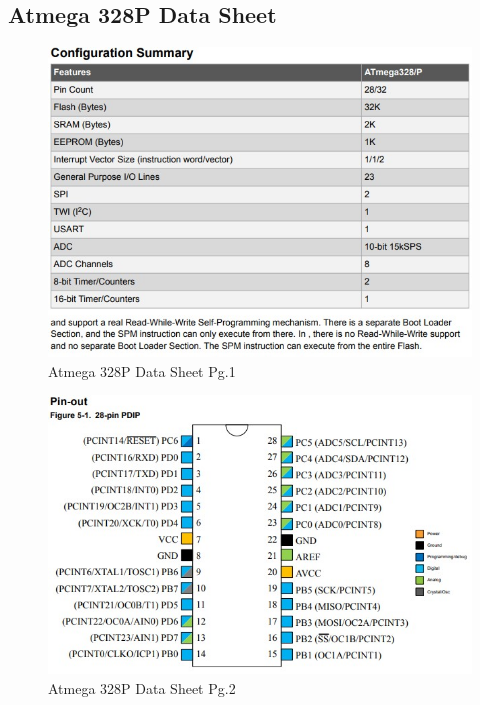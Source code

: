 \documentclass[12pt]{article}
\begin{document}
{{{{		\subsection{Atmega 328P Data Sheet}
			\begin{figure}[ht!]
				\centering
				\includegraphics[width=125mm]{assets/Atmega_DataSheet.jpg}
				\caption{Atmega 328P Data Sheet Pg.1\label{overflow}}
			\end{figure}
		
			\begin{figure}[ht!]
				\centering
				\includegraphics[width=125mm]{assets/Atmega_DataSheet2.jpg}
				\caption{Atmega 328P Data Sheet Pg.2\label{overflow}}
			\end{figure}
			
			\clearpage
			
}}}}
\end{document}
